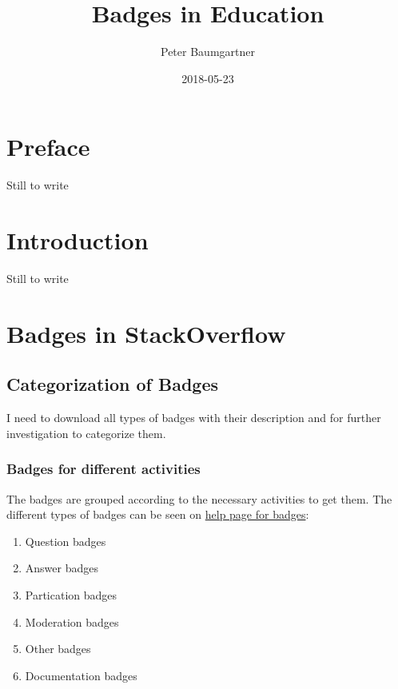 \documentclass[]{book}
\title{Badges in Education}
\author{Peter Baumgartner}
\date{2018-05-23}
\providecommand{\tightlist}{%
  \setlength{\itemsep}{0pt}\setlength{\parskip}{0pt}}
\theoremstyle{definition}
\theoremstyle{definition}
\theoremstyle{definition}
\theoremstyle{remark}
\begin{document}
\maketitle

{
\setcounter{tocdepth}{1}
\tableofcontents
}
\chapter{Preface}\label{preface}

Still to write

\chapter{Introduction}\label{intro}

Still to write

\chapter{Badges in StackOverflow}\label{badges-in-stackoverflow}

\section{Categorization of Badges}\label{categorization-of-badges}

I need to download all types of badges with their description and for
further investigation to categorize them.

\subsection{Badges for different
activities}\label{badges-for-different-activities}

The badges are grouped according to the necessary activities to get
them. The different types of badges can be seen on
\href{https://stackoverflow.com/help/badges}{help page for badges}:

\begin{enumerate}
\def\labelenumi{\arabic{enumi})}
\tightlist
\item
  Question badges
\item
  Answer badges
\item
  Partication badges
\item
  Moderation badges
\item
  Other badges
\item
  Documentation badges
\end{enumerate}
\end{document}
